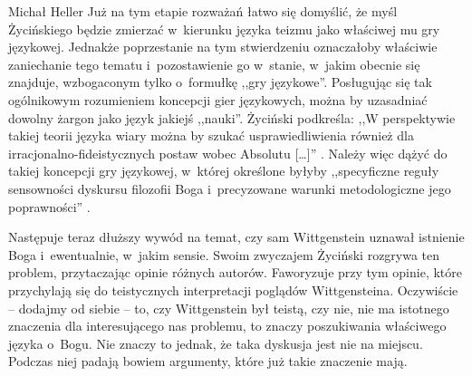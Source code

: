 \begin{artplenv}{Michał Heller}
Już na tym etapie rozważań łatwo się domyślić, że myśl Życińskiego będzie zmierzać w~kierunku języka teizmu jako właściwej mu gry językowej. Jednakże poprzestanie na tym stwierdzeniu oznaczałoby właściwie zaniechanie tego tematu i~pozostawienie go w~stanie, w~jakim obecnie się znajduje, wzbogaconym tylko o~formułkę ,,gry językowe''. Posługując się tak ogólnikowym rozumieniem koncepcji gier językowych, można by uzasadniać dowolny żargon jako język jakiejś ,,nauki''. Życiński podkreśla: ,,W perspektywie takiej teorii języka wiary można by szukać usprawiedliwienia również dla irracjonalno-fideistycznych postaw wobec Absolutu  [\ldots]''
\parencite[][s.~17]{zycinski_teizm_1985}. %
 Należy więc dążyć do takiej koncepcji gry językowej, w~której określone byłyby ,,specyficzne reguły sensowności dyskursu filozofii Boga i~precyzowane warunki metodologiczne jego poprawności'' 
\parencite[][s.~14]{zycinski_teizm_1985}.%


Następuje teraz dłuższy wywód na temat, czy sam Wittgenstein uznawał istnienie Boga i~ewentualnie, w~jakim sensie. Swoim zwyczajem Życiński rozgrywa ten problem, przytaczając opinie różnych autorów. Faworyzuje przy tym opinie, które przychylają się do teistycznych interpretacji poglądów Wittgensteina. Oczywiście -- dodajmy od siebie -- to, czy Wittgenstein był teistą, czy nie, nie ma istotnego znaczenia dla interesującego nas problemu, to znaczy poszukiwania właściwego języka o~Bogu. Nie znaczy to jednak, że taka dyskusja jest nie na miejscu. Podczas niej padają bowiem argumenty, które już takie znaczenie mają.


\end{artplenv}
